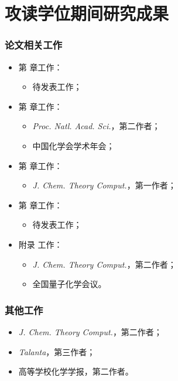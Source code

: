 
\chapter{攻读学位期间研究成果}


\subsection*{论文相关工作}

\begin{itemize}[nosep]
    \item 第  章工作：
    \begin{itemize}[nosep]
        \item 待发表工作；
    \end{itemize}
    \item 第  章工作：
    \begin{itemize}[nosep]
        \item \emph{Proc. Natl. Acad. Sci.}，第二作者；
        \item 中国化学会学术年会；
    \end{itemize}
    \item 第  章工作：
    \begin{itemize}[nosep]
        \item \emph{J. Chem. Theory Comput.}，第一作者；
    \end{itemize}
    \item 第  章工作：
    \begin{itemize}[nosep]
        \item 待发表工作；
    \end{itemize}
    \item 附录  工作：
    \begin{itemize}[nosep]
        \item \emph{J. Chem. Theory Comput.}，第二作者；
        \item 全国量子化学会议。
    \end{itemize}
\end{itemize}

\subsection*{其他工作}

\begin{itemize}[nosep]
    \item \emph{J. Chem. Theory Comput.}，第二作者；
    \item \emph{Talanta}，第三作者；
    \item 高等学校化学学报，第二作者。
\end{itemize}


